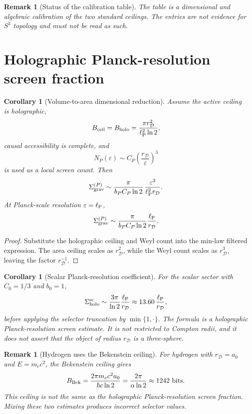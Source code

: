 \documentclass[11pt,a4paper]{article}
\newtheorem{corollary}[theorem]{Corollary}
\newtheorem{remark}[theorem]{Remark}
\newcommand{\ellP}{\ell_{\rm P}}
\begin{document}
\begin{remark}[Status of the calibration table]
The table is a dimensional and algebraic calibration of the two standard ceilings.  The entries are not evidence for $S^3$ topology and must not be read as such.
\end{remark}


\section{Holographic Planck-resolution screen fraction}
\label{sec:holographic-screen}

\begin{corollary}[Volume-to-area dimensional reduction]
Assume the active ceiling is holographic,
\[
B_{\rm ceil}=B_{\rm holo}=\frac{\pi r_{\mathcal D}^2}{\ellP^2\ln2},
\]
causal accessibility is complete, and
\[
N_P(\varepsilon)\sim C_P\left(\frac{r_{\mathcal D}}{\varepsilon}\right)^3
\]
is used as a local screen count.  Then
\[
\Sigma_{\rm grav}^{(P)}
\sim
\frac{\pi}{b_PC_P\ln2}\,
\frac{\varepsilon^3}{\ellP^2r_{\mathcal D}}.
\]
At Planck-scale resolution $\varepsilon=\ellP$,
\[
\Sigma_{\rm grav}^{(P)}
\sim
\frac{\pi}{b_PC_P\ln2}\frac{\ellP}{r_{\mathcal D}}.
\]
\end{corollary}
\begin{proof}
Substitute the holographic ceiling and Weyl count into the min-law filtered expression.  The area ceiling scales as $r_{\mathcal D}^2$, while the Weyl count scales as $r_{\mathcal D}^3$, leaving the factor $r_{\mathcal D}^{-1}$.
\end{proof}

\begin{corollary}[Scalar Planck-resolution coefficient]
For the scalar sector with $C_0=1/3$ and $b_0=1$,
\[
\Sigma_{\rm holo}^{\rm sc}
\sim
\frac{3\pi}{\ln2}\frac{\ellP}{r_{\mathcal D}}
\approx
13.60\,\frac{\ellP}{r_{\mathcal D}},
\]
before applying the selector truncation by $\min\{1,\cdot\}$.  The formula is a holographic Planck-resolution screen estimate.  It is not restricted to Compton radii, and it does not assert that the object of radius $r_{\mathcal D}$ is a three-sphere.
\end{corollary}

\begin{remark}[Hydrogen uses the Bekenstein ceiling]
For hydrogen with $r_{\mathcal D}=a_0$ and $E=m_ec^2$, the Bekenstein ceiling gives
\[
B_{\rm Bek}
=
\frac{2\pi m_ec^2a_0}{\hbar c\ln2}
=
\frac{2\pi}{\alpha\ln2}
\approx1242\ {\rm bits}.
\]
This ceiling is not the same as the holographic Planck-resolution screen fraction.  Mixing these two estimates produces incorrect selector values.
\end{remark}
\end{document}
